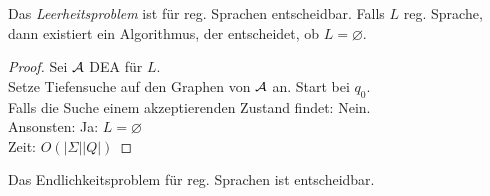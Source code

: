 \begin{Satz}[name={[Leerheitsproblem]}]\label{satz:leerheitsproblem}
        Das \emph{Leerheitsproblem} ist für reg. Sprachen entscheidbar.
        Falls $L$ reg. Sprache, dann existiert ein Algorithmus, der entscheidet, ob $L=\varnothing$.
\end{Satz}
\begin{proof}
	Sei $\mathcal{A}$ \ac{DEA} für $L$.\\
	Setze Tiefensuche auf den Graphen von $\mathcal{A}$ an. Start bei $q_0$.\\
	Falls die Suche einem akzeptierenden Zustand findet: Nein.\\
	Ansonsten: Ja: $L=\varnothing$\\
	Zeit: $O(|\Sigma||Q|)$
\end{proof}

\begin{Satz}[name={[Endlichkeitsproblem]}]\label{satz:endlichkeitsproblem}
        Das Endlichkeitsproblem für reg. Sprachen ist entscheidbar.
\end{Satz}
